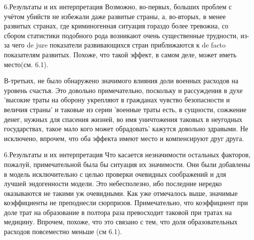 \documentclass[aspectratio=169]{beamer}
\begin{document}
\begin{frame}{6.Результаты и их интерпретация}
\small
Возможно, во-первых, больших проблем с учётом убийств не избежали даже развитые страны, а, во-вторых, в менее развитых странах, где криминогенная ситуация гораздо более тревожна, со сбором статистики подобного рода возникают очень существенные трудности, из-за чего de jure показатели развивающихся стран приближаются к de facto показателям развитых. Похоже, что такой эффект, в самом деле, может иметь место(см. 6.1).
\hfill \break
\hfill \break

В-третьих, не было обнаружено значимого влияния доли военных расходов на уровень
счастья. Это довольно примечательно, поскольку и рассуждения в духе ’высокие траты на оборону укрепляют в гражданах чувство безопасности и величия страны’ и таковые из серии ’военные траты есть, в сущности, сожжение денег, нужных для спасения жизней, во имя уничтожения таковых в неугодных государствах, такое мало кого может обрадовать’ кажутся довольно здравыми. Не исключено, впрочем, что оба эффекта имеют место и компенсируют друг друга.

\normalsize
\end{frame}

\begin{frame}{6.Результаты и их интерпретация}
Что касается незначимости остальных факторов, пожалуй, примечательной была бы ситуация их значимости. Они были добавлены в модель исключительно с целью проверки очевидных соображений и для лучшей эндогенности модели. Это небесполезно, ибо последние нередко оказываются не такими уж очевидными.
Как уже отмечалось выше, значимые коэффициенты не преподнесли сюрпризов. Примечательно, что коэффициент при доле трат на образование в полтора раза превосходит таковой при тратах на медицину. Впрочем, похоже, что это связано с тем, что доля образовательных расходов повсеместно меньше (см 6.1).
\end{frame}
\end{document}

